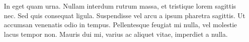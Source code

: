 \documentclass[12pt,a4paper]{article}%
\begin{document}
\begin{justify}%
In eget quam urna. Nullam interdum rutrum massa, et tristique lorem sagittis nec. Sed quis consequat ligula. Suspendisse vel arcu a ipsum pharetra sagittis. Ut accumsan venenatis odio in tempus. Pellentesque feugiat mi nulla, vel molestie lacus tempor non. Mauris dui mi, varius ac aliquet vitae, imperdiet a nulla.%
\end{justify}%
\end{document}
